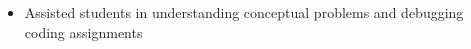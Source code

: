 
\begin{itemize}
  \item Assisted students in understanding conceptual problems and
  debugging coding assignments
\end{itemize}

